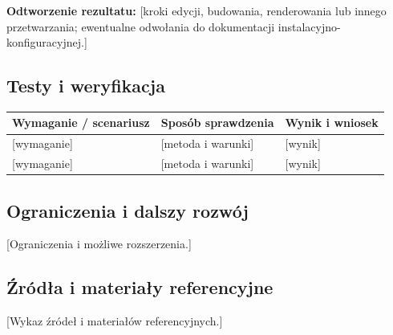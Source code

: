 \documentclass[11pt,a4paper,oneside]{article}
\newif\ifpodpowiedzi
\newcommand{\podpowiedz}[1]{\ifpodpowiedzi\par\begingroup\small\color{hintcolor}\textit{Wskazówka: #1}\par\endgroup\fi}
\newcommand{\pole}[1]{\textnormal{[#1]}}
\begin{document}
\textbf{Odtworzenie rezultatu:}
\pole{kroki edycji, budowania, renderowania lub innego przetwarzania; ewentualne odwołania do dokumentacji instalacyjno-konfiguracyjnej.}

\subsection{Testy i weryfikacja}
\podpowiedz{Powiąż sprawdzenia z wymaganiami. Opisz warunki, dane lub scenariusze, oczekiwane rezultaty, uzyskane wyniki i wnioski. Dobierz metody do charakteru projektu: testy oprogramowania, sprawdzenia prototypu, kontrola jakości animacji lub ocena mechanizmu AI. Wskaż ograniczenia przeprowadzonych sprawdzeń.}
\begin{tabularx}{\textwidth}{@{}Y Y Y@{}}
\toprule
Wymaganie / scenariusz & Sposób sprawdzenia & Wynik i wniosek\\
\midrule
\pole{wymaganie} & \pole{metoda i warunki} & \pole{wynik}\\
\pole{wymaganie} & \pole{metoda i warunki} & \pole{wynik}\\
\bottomrule
\end{tabularx}

\subsection{Ograniczenia i dalszy rozwój}
\podpowiedz{Wskaż znane błędy, ograniczenia techniczne, niespełnione wymagania i zależności wpływające na dalszą pracę. Oddziel stan istniejący od propozycji rozwoju.}
\pole{Ograniczenia i możliwe rozszerzenia.}

\subsection{Źródła i materiały referencyjne}
\podpowiedz{Wymień dokumentację, publikacje, biblioteki, modele i zasoby przywołane w dokumencie. Dla źródeł internetowych podaj tytuł, adres i datę dostępu. Wskaż licencje lub inne warunki wykorzystania materiałów zewnętrznych. Nie pozostawiaj fikcyjnych źródeł.}
\pole{Wykaz źródeł i materiałów referencyjnych.}
\end{document}
